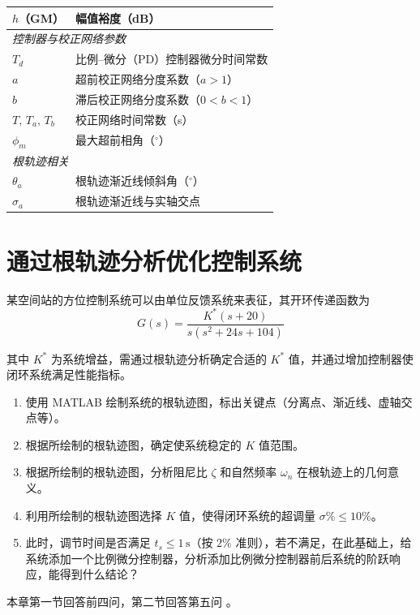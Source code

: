 \documentclass[a4paper]{ctexbook}
\begin{document}
\begin{table}[htbp]
\begin{tabular}{p{3.2cm}p{10cm}}
$h$（GM） & 幅值裕度（dB） \\
\midrule
\multicolumn{2}{l}{\textit{控制器与校正网络参数}} \\
$T_d$ & 比例--微分（PD）控制器微分时间常数 \\
$a$ & 超前校正网络分度系数（$a>1$） \\
$b$ & 滞后校正网络分度系数（$0<b<1$） \\
$T,\,T_a,\,T_b$ & 校正网络时间常数（s） \\
$\phi_m$ & 最大超前相角（$^\circ$） \\
\midrule
\multicolumn{2}{l}{\textit{根轨迹相关}} \\
$\theta_a$ & 根轨迹渐近线倾斜角（$^\circ$） \\
$\sigma_a$ & 根轨迹渐近线与实轴交点 \\
\bottomrule
\end{tabular}
\end{table}



\mainmatter
\chapter{通过根轨迹分析优化控制系统}


某空间站的方位控制系统可以由单位反馈系统来表征，其开环传递函数为
\[
G(s) = \frac{K^*(s+20)}{s(s^2+24s+104)}
\]

其中 $K^*$ 为系统增益，需通过根轨迹分析确定合适的 $K^*$ 值，并通过增加控制器使闭环系统满足性能指标。

\begin{enumerate}
    \item[(1)] 使用 MATLAB 绘制系统的根轨迹图，标出关键点（分离点、渐近线、虚轴交点等）。
    \item[(2)] 根据所绘制的根轨迹图，确定使系统稳定的 $K$ 值范围。
    \item[(3)] 根据所绘制的根轨迹图，分析阻尼比 $\zeta$ 和自然频率 $\omega_n$ 在根轨迹上的几何意义。
    \item[(4)] 利用所绘制的根轨迹图选择 $K$ 值，使得闭环系统的超调量 $\sigma\% \leq 10\%$。
    \item[(5)] 此时，调节时间是否满足 $t_s \leq 1\,\mathrm{s}$（按 $2\%$ 准则），若不满足，在此基础上，给系统添加一个比例微分控制器，分析添加比例微分控制器前后系统的阶跃响应，能得到什么结论？
\end{enumerate}

本章第一节回答前四问，第二节回答第五问                               。
\end{document}
